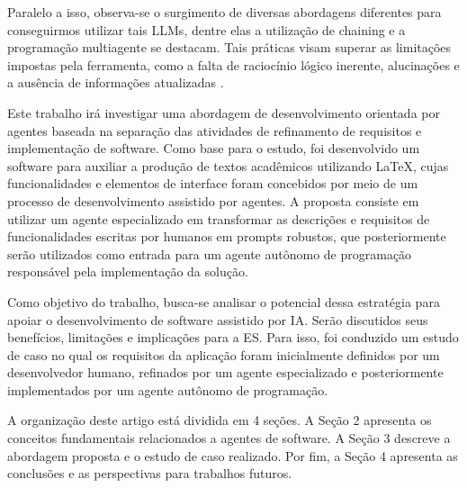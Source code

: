 Paralelo a isso, observa-se o surgimento de diversas abordagens diferentes para conseguirmos utilizar tais LLMs, dentre elas a utilização de chaining e a programação multiagente se destacam. Tais práticas visam superar as limitações impostas pela ferramenta, como a falta de raciocínio lógico inerente, alucinações e a ausência de informações atualizadas \cite{nair_dera_2023}.

Este trabalho irá investigar uma abordagem de desenvolvimento orientada por agentes baseada na separação das atividades de refinamento de requisitos e implementação de software. Como base para o estudo, foi desenvolvido um software para auxiliar a produção de textos acadêmicos utilizando \LaTeX{}, cujas funcionalidades e elementos de interface foram concebidos por meio de um processo de desenvolvimento assistido por agentes. A proposta consiste em utilizar um agente especializado em transformar as descrições e requisitos de funcionalidades escritas por humanos em prompts robustos, que posteriormente serão utilizados como entrada para um agente autônomo de programação responsável pela implementação da solução.

Como objetivo do trabalho, busca-se analisar o potencial dessa estratégia para apoiar o desenvolvimento de software assistido por IA. Serão discutidos seus benefícios, limitações e implicações para a ES. Para isso, foi conduzido um estudo de caso no qual os requisitos da aplicação foram inicialmente definidos por um desenvolvedor humano, refinados por um agente especializado e posteriormente implementados por um agente autônomo de programação.

A organização deste artigo está dividida em 4 seções. A Seção 2 apresenta os conceitos fundamentais relacionados a agentes de software. A Seção 3 descreve a abordagem proposta e o estudo de caso realizado. Por fim, a Seção 4 apresenta as conclusões e as perspectivas para trabalhos futuros.
